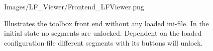 \begin{figure}[htb]
	\begin{minipage}[h]{\textwidth}
		\centering
		\begin{overpic}[width=0.9\linewidth]{Images/LF_Viewer/Frontend_LFViewer.png}
		\end{overpic}
	\end{minipage}
	\label{figure_estimationRange}
	\caption{Illustrates the toolbox front end without any loaded ini-file. In the initial state no segments are unlocked. Dependent on the loaded configuration file different segments with its buttons will unlock.}
\end{figure}
